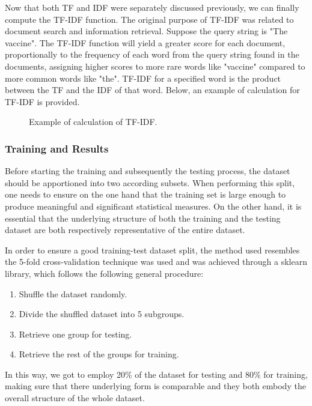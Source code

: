 Now that both TF and IDF were separately discussed previously, we can finally compute the TF-IDF function. The original purpose of TF-IDF was related to document search and information retrieval. Suppose the query string is "The vaccine". The TF-IDF function will yield a greater score for each document, proportionally to the frequency of each word from the query string found in the documents, assigning higher scores to more rare words like "vaccine" compared to more common words like "the". TF-IDF for a specified word is the product between the TF and the IDF of that word. Below, an example of calculation for TF-IDF is provided.

\begin{figure}[h]
  \centering
  \caption{Example of calculation of TF-IDF.}
\end{figure}
\subsubsection{Training and Results}

Before starting the training and subsequently the testing process, the dataset should be apportioned into two according subsets. When performing this split, one needs to ensure on the one hand that the training set is large enough to produce meaningful and significant statistical measures. On the other hand, it is essential that the underlying structure of both the training and the testing dataset are both respectively representative of the entire dataset.

In order to ensure a good training-test dataset split, the method used resembles the 5-fold cross-validation technique was used and was achieved through a sklearn library, which follows the following general procedure:
\begin{enumerate}
  \item Shuffle the dataset randomly.
  \item Divide the shuffled dataset into 5 subgroups.
  \item Retrieve one group for testing.
  \item Retrieve the rest of the groups for training.
\end{enumerate}

In this way, we got to employ 20\% of the dataset for testing and 80\% for training, making sure that there underlying form is comparable and they both embody the overall structure of the whole dataset.


